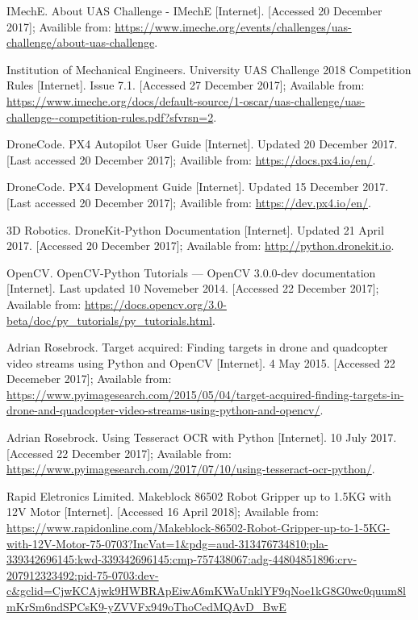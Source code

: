 \documentclass[11pt]{article}
\begin{document}
\newpage
\small
\begin{thebibliography}{11}

    IMechE. About UAS Challenge - IMechE [Internet]. [Accessed 20 December 2017]; Availible from: \url{https://www.imeche.org/events/challenges/uas-challenge/about-uas-challenge}.

    Institution of Mechanical Engineers. University UAS Challenge 2018 Competition Rules [Internet]. Issue 7.1. [Accessed 27 December 2017]; Available from: \url{https://www.imeche.org/docs/default-source/1-oscar/uas-challenge/uas-challenge--competition-rules.pdf?sfvrsn=2}.

    DroneCode. PX4 Autopilot User Guide [Internet]. Updated 20 December 2017. [Last accessed 20 December 2017]; Availible from: \url{https://docs.px4.io/en/}.

    DroneCode. PX4 Development Guide [Internet]. Updated 15 December 2017. [Last accessed 20 December 2017]; Availible from: \url{https://dev.px4.io/en/}.

    3D Robotics. DroneKit-Python Documentation [Internet]. Updated 21 April 2017. [Accessed 20 December 2017]; Available from: \url{http://python.dronekit.io}.

    OpenCV. OpenCV-Python Tutorials — OpenCV 3.0.0-dev documentation [Internet]. Last updated 10 Novemeber 2014. [Accessed 22 December 2017]; Available from: \url{https://docs.opencv.org/3.0-beta/doc/py_tutorials/py_tutorials.html}.

    Adrian Rosebrock. Target acquired: Finding targets in drone and quadcopter video streams using Python and OpenCV [Internet]. 4 May 2015. [Accessed 22 Decemeber 2017]; Available from: \url{https://www.pyimagesearch.com/2015/05/04/target-acquired-finding-targets-in-drone-and-quadcopter-video-streams-using-python-and-opencv/}.

    Adrian Rosebrock. Using Tesseract OCR with Python [Internet]. 10 July 2017. [Accessed 22 December 2017]; Available from: \url{https://www.pyimagesearch.com/2017/07/10/using-tesseract-ocr-python/}.

    Rapid Eletronics Limited. Makeblock 86502 Robot Gripper up to 1.5KG with 12V Motor [Internet]. [Accessed 16 April 2018]; Available from: \url{https://www.rapidonline.com/Makeblock-86502-Robot-Gripper-up-to-1-5KG-with-12V-Motor-75-0703?IncVat=1&pdg=aud-313476734810:pla-339342696145:kwd-339342696145:cmp-757438067:adg-44804851896:crv-207912323492:pid-75-0703:dev-c&gclid=CjwKCAjwk9HWBRApEiwA6mKWaUnklYF9qNoe1kG8G0wc0quum8lmKrSm6ndSPCsK9-yZVVFx949oThoCedMQAvD_BwE}


\end{thebibliography}
\end{document}
